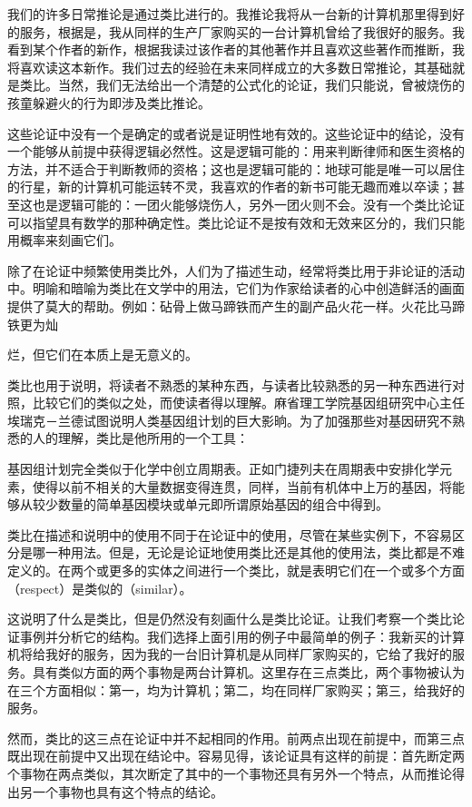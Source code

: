 我们的许多日常推论是通过类比进行的。我推论我将从一台新的计算机那里得到好的服务，根据是，我从同样的生产厂家购买的一台计算机曾给了我很好的服务。我看到某个作者的新作，根据我读过该作者的其他著作并且喜欢这些著作而推断，我将喜欢读这本新作。我们过去的经验在未来同样成立的大多数日常推论，其基础就是类比。当然，我们无法给出一个清楚的公式化的论证，我们只能说，曾被烧伤的孩童躲避火的行为即涉及类比推论。

这些论证中没有一个是确定的或者说是证明性地有效的。这些论证中的结论，没有一个能够从前提中获得逻辑必然性。这是逻辑可能的：用来判断律师和医生资格的方法，并不适合于判断教师的资格；这也是逻辑可能的：地球可能是唯一可以居住的行星，新的计算机可能运转不灵，我喜欢的作者的新书可能无趣而难以卒读；甚至这也是逻辑可能的：一团火能够烧伤人，另外一团火则不会。没有一个类比论证可以指望具有数学的那种确定性。类比论证不是按有效和无效来区分的，我们只能用概率来刻画它们。

除了在论证中频繁使用类比外，人们为了描述生动，经常将类比用于非论证的活动中。明喻和暗喻为类比在文学中的用法，它们为作家给读者的心中创造鲜活的画面提供了莫大的帮助。例如：砧骨上做马蹄铁而产生的副产品火花一样。火花比马蹄铁更为灿

烂，但它们在本质上是无意义的。\cite{chesterton1910}

类比也用于说明，将读者不熟悉的某种东西，与读者比较熟悉的另一种东西进行对照，比较它们的类似之处，而使读者得以理解。麻省理工学院基因组研究中心主任埃瑞克－兰德试图说明人类基因组计划的巨大影晌。为了加强那些对基因研究不熟悉的人的理解，类比是他所用的一个工具：

基因组计划完全类似于化学中创立周期表。正如门捷列夫在周期表中安排化学元素，使得以前不相关的大量数据变得连贯，同样，当前有机体中上万的基因，将能够从较少数量的简单基因模块或单元即所谓原始基因的组合中得到。\cite{lander1995}

类比在描述和说明中的使用不同于在论证中的使用，尽管在某些实例下，不容易区分是哪一种用法。但是，无论是论证地使用类比还是其他的使用法，类比都是不难定义的。在两个或更多的实体之间进行一个类比，就是表明它们在一个或多个方面（respect）是类似的（similar）。

这说明了什么是类比，但是仍然没有刻画什么是类比论证。让我们考察一个类比论证事例并分析它的结构。我们选择上面引用的例子中最简单的例子：我新买的计算机将给我好的服务，因为我的一台旧计算机是从同样厂家购买的，它给了我好的服务。具有类似方面的两个事物是两台计算机。这里存在三点类比，两个事物被认为在三个方面相似：第一，均为计算机；第二，均在同样厂家购买；第三，给我好的服务。

然而，类比的这三点在论证中并不起相同的作用。前两点出现在前提中，而第三点既出现在前提中又出现在结论中。容易见得，该论证具有这样的前提：首先断定两个事物在两点类似，其次断定了其中的一个事物还具有另外一个特点，从而推论得出另一个事物也具有这个特点的结论。

